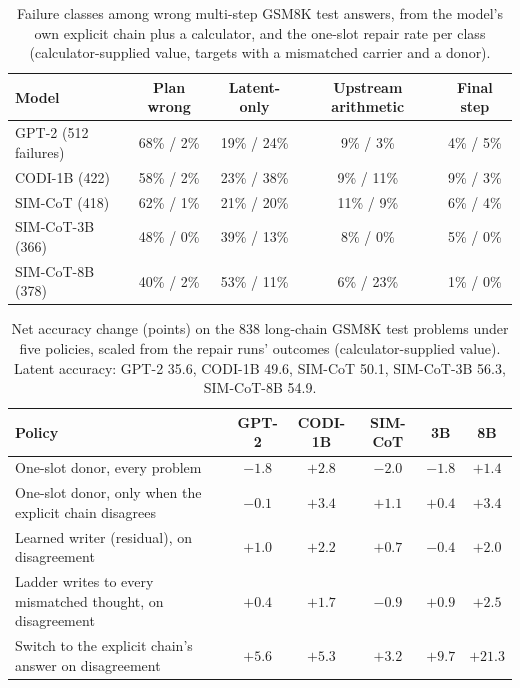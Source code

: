 \begin{table}[htbp]
\caption{Failure classes among wrong multi-step GSM8K test answers, from the model's own explicit chain plus a calculator, and the one-slot repair rate per class (calculator-supplied value, targets with a mismatched carrier and a donor).}
\label{tab:taxonomy}
\centering
\small
\begin{tabular}{lcccc}
\toprule
Model & Plan wrong & Latent-only & Upstream arithmetic & Final step \\
\midrule
GPT-2 (512 failures) & 68\% / 2\% & 19\% / 24\% & 9\% / 3\% & 4\% / 5\% \\
CODI-1B (422) & 58\% / 2\% & 23\% / 38\% & 9\% / 11\% & 9\% / 3\% \\
SIM-CoT (418) & 62\% / 1\% & 21\% / 20\% & 11\% / 9\% & 6\% / 4\% \\
SIM-CoT-3B (366) & 48\% / 0\% & 39\% / 13\% & 8\% / 0\% & 5\% / 0\% \\
SIM-CoT-8B (378) & 40\% / 2\% & 53\% / 11\% & 6\% / 23\% & 1\% / 0\% \\
\bottomrule
\end{tabular}
\end{table}

\begin{table}[htbp]
\caption{Net accuracy change (points) on the 838 long-chain GSM8K test problems under five policies, scaled from the repair runs' outcomes (calculator-supplied value). Latent accuracy: GPT-2 35.6, CODI-1B 49.6, SIM-CoT 50.1, SIM-CoT-3B 56.3, SIM-CoT-8B 54.9.}
\label{tab:policies}
\centering
\scriptsize
\setlength{\tabcolsep}{2pt}
\begin{tabular}{lccccc}
\toprule
Policy & GPT-2 & CODI-1B & SIM-CoT & 3B & 8B \\
\midrule
One-slot donor, every problem & $-1.8$ & $+2.8$ & $-2.0$ & $-1.8$ & $+1.4$ \\
One-slot donor, only when the explicit chain disagrees & $-0.1$ & $+3.4$ & $+1.1$ & $+0.4$ & $+3.4$ \\
Learned writer (residual), on disagreement & $+1.0$ & $+2.2$ & $+0.7$ & $-0.4$ & $+2.0$ \\
Ladder writes to every mismatched thought, on disagreement & $+0.4$ & $+1.7$ & $-0.9$ & $+0.9$ & $+2.5$ \\
Switch to the explicit chain's answer on disagreement & $+5.6$ & $+5.3$ & $+3.2$ & $+9.7$ & $+21.3$ \\
\bottomrule
\end{tabular}
\end{table}

